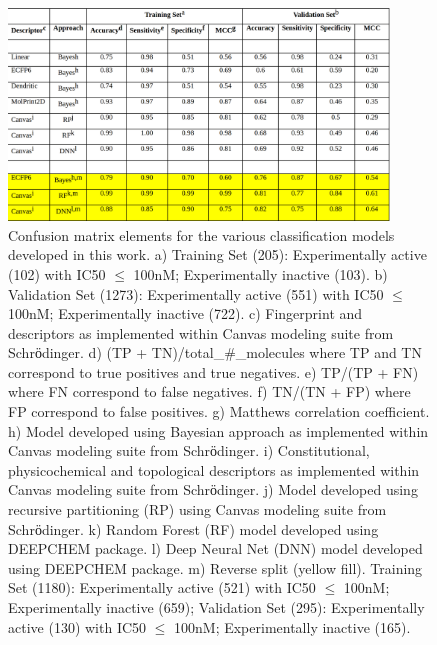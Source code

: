 \begin{figure}
  \centering
  \includegraphics[width=0.9\textwidth]{Images/bace_table_1.png}
  \caption{Confusion matrix elements for the various classification models developed in this work. a) Training Set (205):  Experimentally active (102) with IC50 $\leq$ 100nM; Experimentally inactive (103). b) Validation Set (1273):  Experimentally active (551) with IC50 $\leq$  100nM; Experimentally inactive (722). c) Fingerprint and descriptors as implemented within Canvas modeling suite from Schrӧdinger. d) (TP + TN)/total\_\#\_molecules where TP and TN correspond to true positives and true negatives. e) TP/(TP + FN) where FN correspond to false negatives. f) TN/(TN + FP) where FP correspond to false positives. g) Matthews correlation coefficient. h) Model developed using Bayesian approach as implemented within Canvas modeling suite from Schrӧdinger. i) Constitutional, physicochemical and topological descriptors as implemented within Canvas modeling suite from Schrӧdinger. j) Model developed using recursive partitioning (RP) using Canvas modeling suite from Schrӧdinger. k) Random Forest (RF) model developed using DEEPCHEM package. l) Deep Neural Net (DNN) model developed using DEEPCHEM package. m) Reverse split (yellow fill).  Training Set (1180):  Experimentally active (521) with IC50 $\leq$ 100nM; Experimentally inactive (659); Validation Set (295):  Experimentally active (130) with IC50 $\leq$ 100nM; Experimentally inactive (165).}
  \label{fig:bace_table1}
\end{figure}

